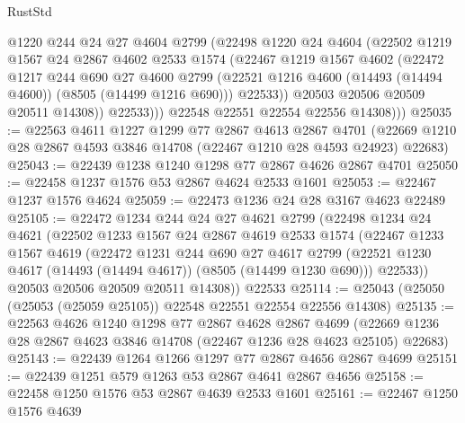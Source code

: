 \begin{lexlean}{RustStd}
\begin{coremodule}
                @1220
                @244
                @24
                @27
                @4604
                @2799
                (@22498
                  @1220
                  @24
                  @4604
                  (@22502
                    @1219
                    @1567
                    @24
                    @2867
                    @4602
                    @2533
                    @1574
                    (@22467
                      @1219
                      @1567
                      @4602
                      (@22472
                        @1217
                        @244
                        @690
                        @27
                        @4600
                        @2799
                        (@22521 @1216 @4600 (@14493 (@14494 @4600)) (@8505 (@14499 @1216 @690)))
                        @22533))
                    @20503
                    @20506
                    @20509
                    @20511
                    @14308))
                @22533)))
          @22548
          @22551
          @22554
          @22556
          @14308)))
@25035 := @22563
    @4611
    @1227
    @1299
    @77
    @2867
    @4613
    @2867
    @4701
    (@22669 @1210 @28 @2867 @4593 @3846 @14708 (@22467 @1210 @28 @4593 @24923) @22683)
@25043 := @22439 @1238 @1240 @1298 @77 @2867 @4626 @2867 @4701
@25050 := @22458 @1237 @1576 @53 @2867 @4624 @2533 @1601
@25053 := @22467 @1237 @1576 @4624
@25059 := @22473 @1236 @24 @28 @3167 @4623 @22489
@25105 := @22472
    @1234
    @244
    @24
    @27
    @4621
    @2799
    (@22498
      @1234
      @24
      @4621
      (@22502
        @1233
        @1567
        @24
        @2867
        @4619
        @2533
        @1574
        (@22467
          @1233
          @1567
          @4619
          (@22472
            @1231
            @244
            @690
            @27
            @4617
            @2799
            (@22521 @1230 @4617 (@14493 (@14494 @4617)) (@8505 (@14499 @1230 @690)))
            @22533))
        @20503
        @20506
        @20509
        @20511
        @14308))
    @22533
@25114 := @25043 (@25050 (@25053 (@25059 @25105)) @22548 @22551 @22554 @22556 @14308)
@25135 := @22563
    @4626
    @1240
    @1298
    @77
    @2867
    @4628
    @2867
    @4699
    (@22669 @1236 @28 @2867 @4623 @3846 @14708 (@22467 @1236 @28 @4623 @25105) @22683)
@25143 := @22439 @1264 @1266 @1297 @77 @2867 @4656 @2867 @4699
@25151 := @22439 @1251 @579 @1263 @53 @2867 @4641 @2867 @4656
@25158 := @22458 @1250 @1576 @53 @2867 @4639 @2533 @1601
@25161 := @22467 @1250 @1576 @4639

\end{coremodule}
\end{lexlean}
